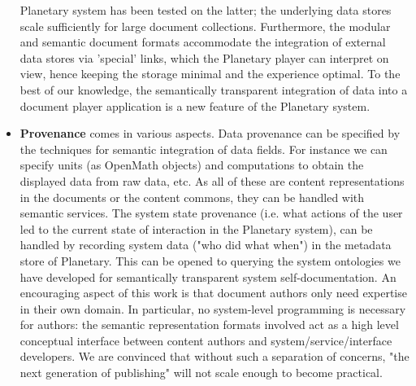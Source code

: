 \begin{itemize}
  Planetary system has been tested on the latter; the underlying data stores scale
  sufficiently for large document collections. Furthermore, the modular and semantic
  document formats accommodate the integration of external data stores via 'special'
  links, which the Planetary player can interpret on view, hence keeping the storage
  minimal and the experience optimal. To the best of our knowledge, the semantically
  transparent integration of data into a document player application is a new feature of
  the Planetary system.
\item \textbf{Provenance} comes in various aspects. Data provenance can be specified by
  the techniques for semantic integration of data fields. For instance we can specify
  units (as OpenMath objects) and computations to obtain the displayed data from raw data,
  etc. As all of these are content representations in the documents or the content
  commons, they can be handled with semantic services. The system state provenance
  (i.e. what actions of the user led to the current state of interaction in the Planetary
  system), can be handled by recording system data ("who did what when") in the metadata
  store of Planetary. This can be opened to querying the system ontologies we have
  developed for semantically transparent system self-documentation. An encouraging aspect
  of this work is that document authors only need expertise in their own domain. In
  particular, no system-level programming is necessary for authors: the semantic
  representation formats involved act as a high level conceptual interface between content
  authors and system/service/interface developers. We are convinced that without such a
  separation of concerns, "the next generation of publishing" will not scale enough to
  become practical.
\end{itemize}

